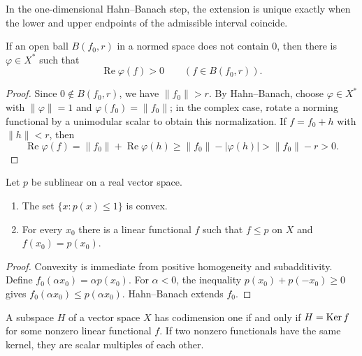 \begin{noteexercise}
In the one-dimensional Hahn--Banach step, the extension is unique exactly
when the lower and upper endpoints of the admissible interval coincide.
\end{noteexercise}

\begin{noteexercise}
If an open ball $B(f_0,r)$ in a normed space does not contain $0$, then there
is $\varphi\in X^*$ such that
\[
  \operatorname{Re}\varphi(f)>0
  \qquad(f\in B(f_0,r)).
\]
\end{noteexercise}

\begin{proof}
Since $0\notin B(f_0,r)$, we have $\|f_0\|>r$.  By Hahn--Banach, choose
$\varphi\in X^*$ with $\|\varphi\|=1$ and
$\varphi(f_0)=\|f_0\|$; in the complex case, rotate a norming functional by a
unimodular scalar to obtain this normalization.  If $f=f_0+h$ with
$\|h\|<r$, then
\[
  \operatorname{Re}\varphi(f)
  =\|f_0\|+\operatorname{Re}\varphi(h)
  \ge \|f_0\|-|\varphi(h)|
  >\|f_0\|-r
  >0.
\]
\end{proof}

\begin{noteexercise}
Let $p$ be sublinear on a real vector space.
\begin{enumerate}
  \item The set $\{x:p(x)\le1\}$ is convex.
  \item For every $x_0$ there is a linear functional $f$ such that
        $f\le p$ on $X$ and $f(x_0)=p(x_0)$.
\end{enumerate}
\end{noteexercise}

\begin{proof}
Convexity is immediate from positive homogeneity and subadditivity.  Define
$f_0(\alpha x_0)=\alpha p(x_0)$.  For $\alpha<0$, the inequality
$p(x_0)+p(-x_0)\ge0$ gives
$f_0(\alpha x_0)\le p(\alpha x_0)$.  Hahn--Banach extends $f_0$.
\end{proof}

\begin{noteexercise}[Hyperplanes]
A subspace $H$ of a vector space $X$ has codimension one if and only if
$H=\operatorname{Ker} f$ for some nonzero linear functional $f$.  If two nonzero
functionals have the same kernel, they are scalar multiples of each other.
\end{noteexercise}

